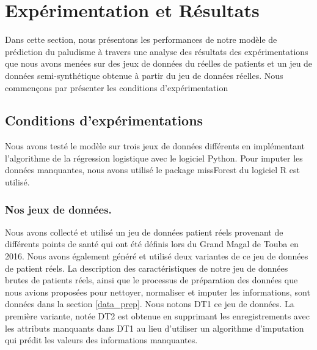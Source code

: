 \section{Expérimentation et Résultats}\label{Expérimentation et Résultats}
Dans cette section, nous présentons les performances de notre modèle de prédiction  du paludisme à travers une analyse des résultats des expérimentations que nous avons menées sur des jeux de données du  réelles de patients  et un jeu de données semi-synthétique obtenue  à partir du jeu de données réelles. Nous commençons par présenter les conditions d’expérimentation
\subsection{Conditions d’expérimentations}
Nous avons testé le modèle sur trois jeux de données différents en implémentant l’algorithme de la régression logistique avec le logiciel Python. Pour imputer  les données manquantes, nous avons utilisé le package missForest du logiciel R est utilisé.

\subsubsection{Nos jeux de données.} Nous avons collecté et utilisé un jeu de données patient réels provenant de différents points de santé qui ont été définis lors du Grand Magal de Touba en 2016. Nous avons également généré et utilisé deux variantes de ce jeu de données de patient réels. La description des caractéristiques de notre jeu de données brutes de patients réels, ainsi que le processus  de préparation des données que nous avions proposées pour nettoyer, normaliser et imputer les informations, sont données dans la section \ref{data_prep}. Nous notons \textsc{DT1} ce jeu de données.
La première variante, notée \textsc{DT2} est obtenue en supprimant les enregistrements avec les attributs manquants dans \textsc{DT1} au lieu d'utiliser un algorithme d'imputation qui prédit les valeurs des informations manquantes.

